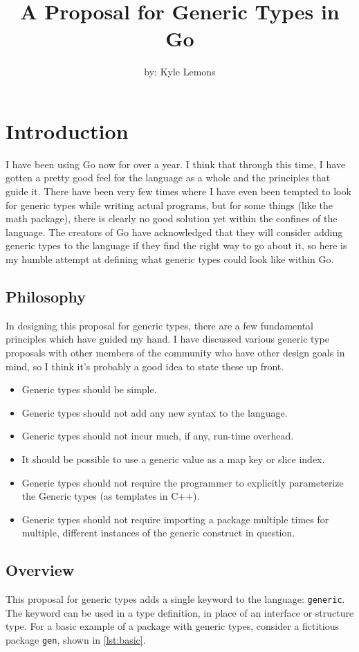 \documentclass[10pt,a4paper]{article}
\author{by: Kyle Lemons}
\title{A Proposal for Generic Types in Go}
\newcommand{\code}[1]{\texttt{#1}}
\newcommand{\Listing}[1]{\autoref{lst:#1}}
\begin{document}
\maketitle
\tableofcontents
\lstlistoflistings
\newpage
\section{Introduction}
I have been using Go now for over a year.  I think that through this time, I have gotten a pretty good feel for the language as a whole and the principles that guide it.  There have been very few times where I have even been tempted to look for generic types while writing actual programs, but for some things (like the math package), there is clearly no good solution yet within the confines of the language.  The creators of Go have acknowledged that they will consider adding generic types to the language if they find the right way to go about it, so here is my humble attempt at defining what generic types could look like within Go.

\subsection{Philosophy}
In designing this proposal for generic types, there are a few fundamental principles which have guided my hand.  I have discussed various generic type proposals with other members of the community who have other design goals in mind, so I think it's probably a good idea to state these up front.
\begin{itemize}
\item Generic types should be simple.
\item Generic types should not add any new syntax to the language.
\item Generic types should not incur much, if any, run-time overhead.
\item It should be possible to use a generic value as a map key or slice index.
\item Generic types should not require the programmer to explicitly parameterize the Generic types (as templates in C++).
\item Generic types should not require importing a package multiple times for multiple, different instances of the generic construct in question.
\end{itemize}

\subsection{Overview}
This proposal for generic types adds a single keyword to the language: \code{generic}.  The keyword can be used in a type definition, in place of an interface or structure type.  For a basic example of a package with generic types, consider a fictitious package \code{gen}, shown in \Listing{basic}.
\end{document}
